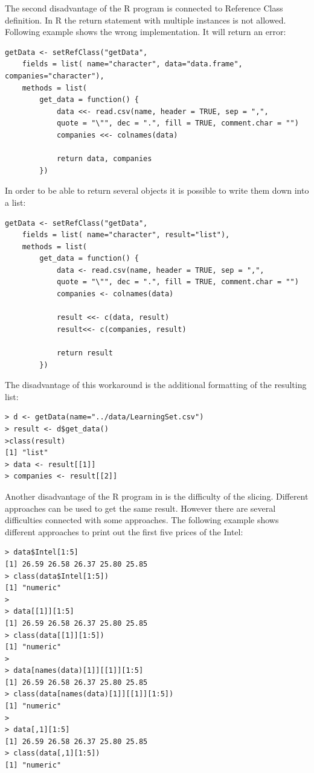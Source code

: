 \documentclass[
  twoside,
  12pt, a4paper,
  footinclude=true,
  headinclude=true,
  cleardoublepage=empty
]{article}
\begin{document}
The second disadvantage of the R program is connected to Reference Class definition. In R the return statement with multiple instances is not allowed. Following example shows the wrong implementation. It will return an error:
\begin{verbatim}
getData <- setRefClass("getData",
    fields = list( name="character", data="data.frame", companies="character"),
	methods = list( 
    	get_data = function() {
            data <<- read.csv(name, header = TRUE, sep = ",", 
            quote = "\"", dec = ".", fill = TRUE, comment.char = "")
			companies <<- colnames(data)
			
			return data, companies
		})
\end{verbatim}
In order to be able to return several objects it is possible to write them down into a list:
\begin{verbatim}
getData <- setRefClass("getData",
    fields = list( name="character", result="list"),
	methods = list( 
    	get_data = function() {
            data <- read.csv(name, header = TRUE, sep = ",", 
            quote = "\"", dec = ".", fill = TRUE, comment.char = "")
			companies <- colnames(data)
            
            result <<- c(data, result)
            result<<- c(companies, result)
            
            return result            			
		})
\end{verbatim}
The disadvantage of this workaround is the additional formatting of the resulting list:
\begin{verbatim}
> d <- getData(name="../data/LearningSet.csv")
> result <- d$get_data()
>class(result)
[1] "list"
> data <- result[[1]]
> companies <- result[[2]]
\end{verbatim}
Another disadvantage of the R program in is the difficulty of the slicing. Different approaches can be used to get the same result. However there are several difficulties connected with some approaches. The following example shows different approaches to print out the first five prices of the Intel:
\begin{verbatim}
> data$Intel[1:5]
[1] 26.59 26.58 26.37 25.80 25.85
> class(data$Intel[1:5])
[1] "numeric"
>
> data[[1]][1:5]
[1] 26.59 26.58 26.37 25.80 25.85
> class(data[[1]][1:5])
[1] "numeric"
>
> data[names(data)[1]][[1]][1:5]
[1] 26.59 26.58 26.37 25.80 25.85
> class(data[names(data)[1]][[1]][1:5])
[1] "numeric"
>
> data[,1][1:5]
[1] 26.59 26.58 26.37 25.80 25.85
> class(data[,1][1:5])
[1] "numeric"
\end{verbatim}
\end{document}
